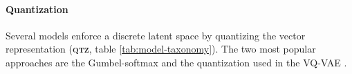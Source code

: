 \paragraph{Quantization} 
Several models enforce a discrete latent space by quantizing the vector representation (\textbf{\textsc{qtz}}, table \ref{tab:model-taxonomy}). The two most popular approaches are the Gumbel-softmax \cite{jang2016categorical, maddison2016concrete} and the quantization used in the VQ-VAE \cite{oord_neural_2018}.


